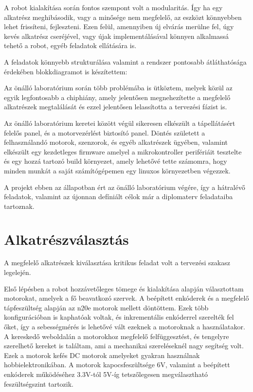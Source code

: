 A robot kialakítása során fontos szempont volt a modularitás. Így ha egy
alkatrész meghibásodik, vagy a minősége nem megfelelő, az eszközt könnyebben
lehet frissíteni, fejleszteni. Ezen felül, amennyiben új elvárás merülne fel,
úgy kevés alkatrész cseréjével, vagy újak implementálásával könnyen alkalmassá
tehető a robot, egyéb feladatok ellátására is.

A feladatok könnyebb strukturálása valamint a rendszer pontosabb átláthatósága
érdekében blokkdiagramot is készítettem:


Az önálló laboratórium során több problémába is ütköztem, melyek közül az egyik
legfontosabb a chiphiány, amely jelentősen megnehezítette a  megfelelő alkatrészek
megtalálását és ezzel jelentősen lelassította a tervezési fázist is.

Az önálló laboratórium keretei között végül sikeresen elkészült a tápellátásért
felelős panel, és a motorvezérlést biztosító panel. Döntés született a
felhasználandó motorok, szenzorok, és egyéb alkatrészek ügyében, valamint
elkészült egy kezdetleges firmware amelyel a mikrokontroller perifériáit
tesztelte és egy hozzá tartozó build környezet, amely lehetővé tette számomra,
hogy minden munkát a saját számítógépemen egy linuxos környezetben végezzek.

A projekt ebben az állapotban ért az önálló laboratórium végére, így a hátralévő
feladatok, valamint az újonnan defíniált célok már a diplomaterv feladataiba
tartoznak.


\section{Alkatrészválasztás}

A megfelelő alkatrészek kiválasztása kritikus feladat volt a tervezési szakasz
legelején.

Első lépésben a robot hozzávetőleges tömege és kialakítása alapján választottam
motorokat, amelyek a fő beavatkozó szervek. A beépített enkóderek és a megfelelő
tápfeszültség alapján az n20e motorok mellett döntöttem. Ezek több
konfigurációban is kaphatóak voltak, és inkrementális enkóderrel szerelték fel
őket, így a sebességmérés is lehetővé vált ezeknek a motoroknak a használatakor.
A kereskedő weboldalán a motorokhoz megfelelő felfüggesztést, és tengelyre
szerelhető kereket is találtam, ami a mechanikai szereléseknél nagy segítség
volt. Ezek a motorok kefés DC motorok amelyeket gyakran használnak
hobbielektronikában. A motorok kapocsfeszültsége 6V, valamint a beépített
enkóderek működéséhez 3.3V-tól 5V-íg tetszőlegesen megválasztható feszültségszint
tartozik.


